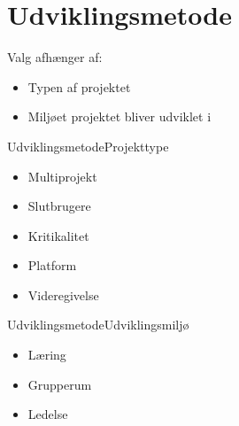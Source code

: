 \section*{Udviklingsmetode}

\begin{frame}
	Valg afhænger af:
	\begin{itemize}
		\item Typen af projektet
		\item Miljøet projektet bliver udviklet i
	\end{itemize}
	
\end{frame}

\begin{frame}{Udviklingsmetode}{Projekttype}
	\begin{itemize}
		\item Multiprojekt
		\item Slutbrugere
		\item Kritikalitet
		\item Platform
		\item Videregivelse
	\end{itemize}
	
\end{frame}

\begin{frame}{Udviklingsmetode}{Udviklingsmiljø}
	
	\begin{itemize}
		\item Læring
		\item Grupperum
		\item Ledelse
	\end{itemize}
	
\end{frame}

